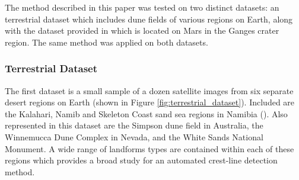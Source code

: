 The method described in this paper was tested on two distinct datasets: an terrestrial dataset which includes dune fields of various regions on Earth, along with the dataset provided in \cite{vaz_object_based_dune_analysis} which is located on Mars in the Ganges crater region. The same method was applied on both datasets.

\subsubsection{Terrestrial Dataset}
\label{subsec:terrestrial_dataset}
The first dataset is a small sample of a dozen satellite images from six separate desert regions on Earth (shown in Figure \ref{fig:terrestrial_dataset}). Included are the Kalahari, Namib and Skeleton Coast sand sea regions in Namibia (\cite{goudie_desert_landforms_namibia}). Also represented in this dataset are the Simpson dune field in Australia, the Winnemucca Dune Complex in Nevada, and the White Sands National Monument. A wide range of landforms types are contained within each of these regions which provides a broad study for an automated crest-line detection method. 

